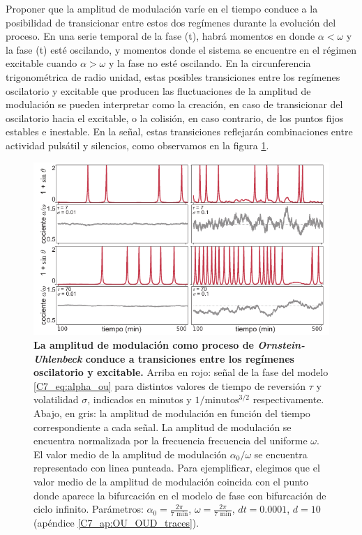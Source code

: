 \documentclass[./main.tex]{subfiles}
\begin{document}
Proponer que la amplitud de modulación varíe en el tiempo conduce a la posibilidad de transicionar entre estos dos regímenes durante la evolución del proceso. En una serie temporal de la fase \xx(t), habrá momentos en donde $\alpha < \omega$ y la fase \xx(t) esté oscilando, y momentos donde el sistema se encuentre en el régimen excitable cuando $\alpha > \omega$ y la fase no esté oscilando. En la circunferencia trigonométrica de radio unidad, estas posibles transiciones entre los regímenes oscilatorio y excitable que producen las fluctuaciones de la amplitud de modulación se pueden interpretar como la creación, en caso de transicionar del oscilatorio hacia el excitable, o la colisión, en caso contrario, de los puntos fijos estables e inestable. En la señal, estas transiciones reflejarán combinaciones entre actividad pulsátil y silencios, como observamos en la figura \ref{C7_fig:OU_TS}.

\begin{figure}
    \centering
    \includegraphics[width=1\columnwidth]{figures/chapter7/C7_OU_ex_traces.pdf} 
    \caption{\textbf{La amplitud de modulación como proceso de \textit{Ornstein-Uhlenbeck} conduce a transiciones entre los regímenes oscilatorio y excitable.}
    Arriba en rojo: señal de la fase del modelo \ref{C7_eq:alpha_ou} para distintos valores de tiempo de reversión $\tau$ y volatilidad $\sigma$, indicados en minutos y $1/\text{minutos}^{3/2}$ respectivamente. Abajo, en gris: la amplitud de modulación en función del tiempo correspondiente a cada señal. La amplitud de modulación se encuentra normalizada por la frecuencia frecuencia del uniforme $\omega$. El valor medio de la amplitud de modulación $\alpha_0/\omega$ se encuentra representado con linea punteada. Para ejemplificar, elegimos que el valor medio de la amplitud de modulación coincida con el punto donde aparece la bifurcación en el modelo de fase con bifurcación de ciclo infinito. Parámetros: $\alpha_0 = \frac{2\pi}{7 \text{ min}}$, $\omega = \frac{2\pi}{7 \text{ min}}$, $dt = 0.0001$, $d=10$ (apéndice \ref{C7_ap:OU_OUD_traces}).}
    \label{C7_fig:OU_TS}
\end{figure} 
\end{document}
